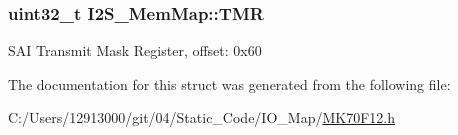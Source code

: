 \subsubsection[{T\+M\+R}]{\setlength{\rightskip}{0pt plus 5cm}uint32\+\_\+t I2\+S\+\_\+\+Mem\+Map\+::\+T\+M\+R}\label{struct_i2_s___mem_map_a52b2dd69044a5f8c990749c314664ae1}
S\+A\+I Transmit Mask Register, offset\+: 0x60 

The documentation for this struct was generated from the following file\+:\begin{DoxyCompactItemize}
\item 
C\+:/\+Users/12913000/git/04/\+Static\+\_\+\+Code/\+I\+O\+\_\+\+Map/\hyperlink{_m_k70_f12_8h}{M\+K70\+F12.\+h}\end{DoxyCompactItemize}
